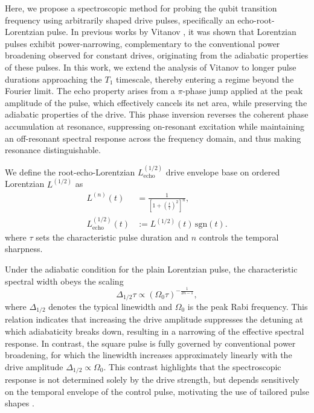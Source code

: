Here, we propose a spectroscopic method for probing the qubit transition frequency using arbitrarily shaped drive pulses, specifically an echo-root-Lorentzian pulse. In previous works by Vitanov \cite{boradjiev_power_2013}, it was shown that Lorentzian pulses exhibit power-narrowing, complementary to the conventional power broadening observed for constant drives, originating from the adiabatic properties of these pulses. In this work, we extend the analysis of Vitanov to longer pulse durations approaching the $T_1$ timescale, thereby entering a regime beyond the Fourier limit. The echo property arises from a $\pi$-phase jump applied at the peak amplitude of the pulse, which  effectively cancels its net area, while preserving the adiabatic properties of the drive. This phase inversion reverses the coherent phase accumulation at resonance, suppressing on-resonant excitation while maintaining an off-resonant spectral response across the frequency domain, and thus making resonance distinguishable.

We define the root-echo-Lorentzian $L_{\text{echo}}^{(1/2)} $ drive envelope base on ordered Lorentzian $L^{(1/2)}$ as
\begin{align}
L^{(n)}(t)
&= \frac{1}{\left[1+\left(\frac{t}{\tau}\right)^2\right]^n},
\\
L^{(1/2)}_{\mathrm{echo}}(t)
&:= L^{(1/2)}(t)\,\mathrm{sgn}(t).
\label{eq:Ln}
\end{align}
where $\tau$ sets the characteristic pulse duration and $n$ controls the temporal sharpness.

Under the adiabatic condition for the plain Lorentzian pulse, the characteristic spectral width obeys the scaling
\begin{equation}
\Delta_{1/2}\tau
\propto
(\Omega_0 \tau)^{-\frac{1}{2n-1}},
\label{eq:lorentzian_adiabatic}
\end{equation}
where $\Delta_{1/2}$ denotes the typical linewidth and $\Omega_0$ is the peak Rabi frequency. This relation indicates that increasing the drive amplitude suppresses the detuning at which adiabaticity breaks down, resulting in a narrowing of the effective spectral response. In contrast, the square pulse is fully governed by conventional power broadening, for which the linewidth increases approximately linearly with the drive amplitude $\Delta_{1/2}\propto\Omega_0$. This contrast highlights that the spectroscopic response is not determined solely by the drive strength, but depends sensitively on the temporal envelope of the control pulse, motivating the use of tailored pulse shapes \cite{VITANOV2001117,HALFMANN2003353,PhysRevA.70.053407,PhysRevA.57.79,PhysRev.40.502}.

